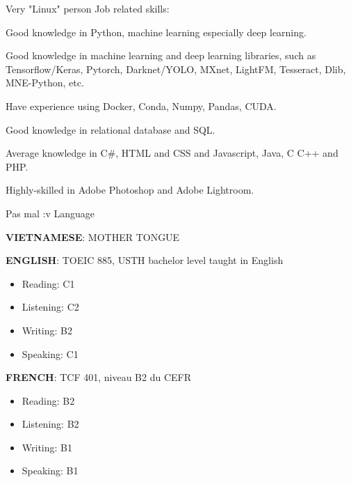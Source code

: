 

\begin{cventries}

  \cventry
    {Very "Linux" person} %
    {Job related skills:} %
    { } %
    { } %
    {
      \begin{cvitems} %
        \item {Good knowledge in Python, machine learning especially deep learning.}
        \item {Good knowledge in machine learning and deep learning libraries, such as Tensorflow/Keras, Pytorch, Darknet/YOLO, MXnet, LightFM, Tesseract, Dlib, MNE-Python, etc.}
        \item {Have experience using Docker, Conda, Numpy, Pandas, CUDA.}
        \item {Good knowledge in relational database and SQL.}
        \item {Average knowledge in C#, HTML and CSS and Javascript, Java, C C++ and PHP.}
        \item {Highly-skilled in Adobe Photoshop and Adobe Lightroom.}        
      \end{cvitems}
    }

  \cventry
    {Pas mal :v} %
    {Language} %
    { } %
    { } %
    {
      \begin{cvitems} %
        \item {\textbf{VIETNAMESE}: MOTHER TONGUE}
        \item {\textbf{ENGLISH}: TOEIC 885, USTH bachelor level taught in English
                \begin{itemize}
                  \item Reading: C1
                  \item Listening: C2
                  \item Writing: B2
                  \item Speaking: C1
                \end{itemize}}
        \item {\textbf{FRENCH}: TCF 401, niveau B2 du CEFR
                \begin{itemize}
                  \item Reading: B2
                  \item Listening: B2
                  \item Writing: B1
                  \item Speaking: B1
                \end{itemize}}        
      \end{cvitems}
    }


\end{cventries}
